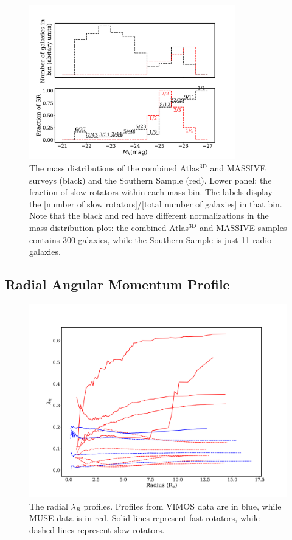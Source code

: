 			

			


			
			\begin{figure}
				\centering
				\includegraphics[width=0.8\textwidth]{chapter4/M_k_binned.png}
				\caption[Upper panel: Mass matching global kinematics]{The mass distributions of the combined Atlas$^\text{3D}$ and MASSIVE surveys (black) and the Southern Sample (red). Lower panel: the fraction of slow rotators within each mass bin. The labels display the [number of slow rotators]/[total number of galaxies] in that bin. Note that the black and red have different normalizations in the mass distribution plot: the combined Atlas$^\text{3D}$ and MASSIVE samples contains 300 galaxies, while the Southern Sample is just 11 radio galaxies.}
				\label{fig:SRmassFraction}
			\end{figure}

		\subsection{Radial Angular Momentum Profile}
			\label{subsec:ResolvedLambda_R}
			\begin{figure}
				\centering
				\includegraphics[width=.7\textwidth]{chapter4/lambda_R.png}
				\caption[$\lambda_{R}$ radial profiles]{The radial $\lambda_{R}$ profiles. Profiles from VIMOS data are in blue, while MUSE data is in red. Solid lines represent fast rotators, while dashed lines represent slow rotators.}
				\label{fig:lambdaR_profile}
			\end{figure}

